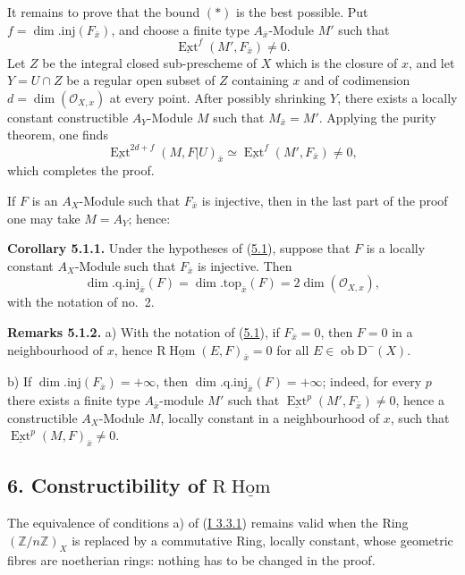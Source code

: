 \documentclass[11pt]{article}
\DeclareMathOperator{\Hom}{Hom}
\DeclareMathOperator{\Ext}{Ext}
\newcommand{\R}{\mathrm{R}}
\newcommand{\D}{\mathrm{D}}
\newcommand{\Z}{\mathbb{Z}}
\newcommand{\ob}{\operatorname{ob}}
\providecommand{\Hom}{\operatorname{Hom}}
\providecommand{\ob}{\operatorname{ob}}
\providecommand{\R}{\mathrm R}
\providecommand{\Z}{\mathbb Z}
\providecommand{\Hom}{\operatorname{Hom}}
\begin{document}
It remains to prove that the bound $(*)$ is the best possible. Put $f=\dim.\mathrm{inj}(F_{\bar{x}})$, and choose a finite type $A_{\bar{x}}$-Module $M'$ such that
\[
        \underline{\Ext}^f(M',F_{\bar{x}})\neq0.
\]
Let $Z$ be the integral closed sub-prescheme of $X$ which is the closure of $x$, and let $Y=U\cap Z$ be a regular open subset of $Z$ containing $x$ and of codimension $d=\dim(\mathcal{O}_{X,x})$ at every point. After possibly shrinking $Y$, there exists a locally constant constructible $A_Y$-Module $M$ such that $M_{\bar{x}}=M'$. Applying the purity theorem, one finds
\[
        \underline{\Ext}^{2d+f}(M,F|U)_{\bar{x}}\simeq \underline{\Ext}^f(M',F_{\bar{x}})\neq0,
\]
which completes the proof.

If $F$ is an $A_X$-Module such that $F_{\bar{x}}$ is injective, then in the last part of the proof one may take $M=A_Y$; hence:

\label{sga5:I:corollary:5.1.1}\textbf{Corollary 5.1.1.} Under the hypotheses of (\hyperref[sga5:I:proposition:5.1]{5.1}), suppose that $F$ is a locally constant $A_X$-Module such that $F_{\bar{x}}$ is injective. Then
\[
        \dim.\mathrm{q.inj}_{\bar{x}}(F)=\dim.\mathrm{top}_{\bar{x}}(F)=2\dim(\mathcal{O}_{X,x}),
\]
with the notation of no.~2.

\label{sga5:I:remark:5.1.2}\textbf{Remarks 5.1.2.} a) With the notation of (\hyperref[sga5:I:proposition:5.1]{5.1}), if $F_{\bar{x}}=0$, then $F=0$ in a neighbourhood of $x$, hence $\R\underline{\Hom}(E,F)_{\bar{x}}=0$ for all $E\in\ob\D^{-}(X)$.

b) If $\dim.\mathrm{inj}(F_{\bar{x}})=+\infty$, then $\dim.\mathrm{q.inj}_{\bar{x}}(F)=+\infty$; indeed, for every $p$ there exists a finite type $A_{\bar{x}}$-module $M'$ such that $\underline{\Ext}^p(M',F_{\bar{x}})\neq0$, hence a constructible $A_X$-Module $M$, locally constant in a neighbourhood of $x$, such that $\underline{\Ext}^p(M,F)_{\bar{x}}\neq0$.

\subsection*{6. Constructibility of $\R\underline{\Hom}$}\label{sga5:I:subsection:6}

The equivalence of conditions a) of (\hyperref[sga5:I:proposition:3.3.1]{I 3.3.1}) remains valid when the Ring $(\Z/n\Z)_X$ is replaced by a commutative Ring, locally constant, whose geometric fibres are noetherian rings: nothing has to be changed in the proof.
\end{document}
